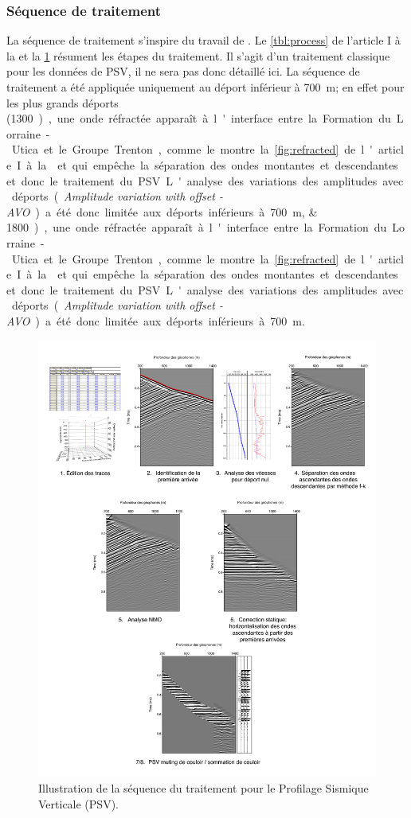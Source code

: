 \subsubsection{Séquence de traitement}
La séquence de traitement s'inspire du travail de
\citet{Coulombe1996,Zhang2010}. Le \cref{tbl:process} de l'article I à la
 et la \cref{fig:traitement} résument les étapes du
traitement. Il s'agit d'un traitement classique pour les données de PSV, il ne
sera pas donc détaillé ici. La séquence de traitement a été appliquée uniquement
au déport inférieur à \SI{700}{\metre}; en effet pour les plus grands déports
(\SIlist{1300;1800} ), une onde réfractée apparaît à l'interface entre la
Formation du Lorraine-Utica et le Groupe Trenton, comme le montre la
\cref{fig:refracted} de l'article I à la  et qui empêche
la séparation des ondes montantes et descendantes et donc le traitement du PSV.
L'analyse des variations des amplitudes avec déports (\emph{Amplitude variation
with offset - AVO}) a été donc limitée aux déports inférieurs à
\SI{700}{\metre}.
\begin{figure}[!ht]
\centering
\includegraphics[width=1\textwidth]{fig/traitement.pdf}
\caption{Illustration de la séquence du traitement pour le Profilage Sismique
Verticale (PSV).}
\label{fig:traitement}
\end{figure}
